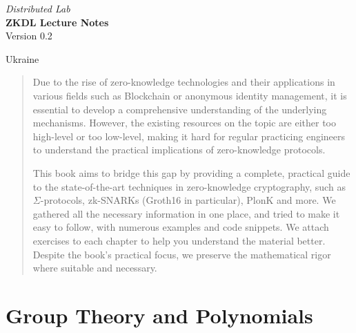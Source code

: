 \documentclass{zkdl-template-105x135-nohead}
\def\maketitle{
    \begin{center}
        \vspace{5mm}
        {\Large\sffamily \emph{Distributed Lab}} \\ \vspace{30mm}
        {\huge\sffamily\bfseries ZKDL Lecture Notes} \\ \vspace{5mm}
        {Version 0.2} \\ \vspace{10mm}
    \end{center}
    
    \vfill

    \begin{center}
        {Ukraine} \\ \vspace{2mm}
        {\sffamily \the\year}
    \end{center}

    \thispagestyle{empty}
    \pagebreak
}
\begin{document}
    \maketitle

    \pagecolor{white}
    
    \begin{abstract}
        \fontsize{7}{8}\selectfont
        Due to the rise of zero-knowledge technologies and their applications in
        various fields such as Blockchain or anonymous identity management, it is
        essential to develop a comprehensive understanding of the underlying
        mechanisms. However, the existing resources on the topic are either too
        high-level or too low-level, making it hard for regular practicing engineers
        to understand the practical implications of zero-knowledge protocols.
    
        This book aims to bridge this gap by providing a complete, practical guide
        to the state-of-the-art techniques in zero-knowledge cryptography, such as
        $\Sigma$-protocols, zk-SNARKs (Groth16 in particular), PlonK and more. We
        gathered all the necessary information in one place, and tried to make it
        easy to follow, with numerous examples and code snippets. We attach
        exercises to each chapter to help you understand the material better.
        Despite the book's practical focus, we preserve the mathematical rigor where
        suitable and necessary.
    \end{abstract}
    
    \thispagestyle{empty}
    \newpage

    \pagestyle{fancy}
    \pagecolor{white}

    \tableofcontents

    \pagebreak




    \section{Group Theory and Polynomials} \label{section:math-crypto-1}

    
\end{document}

